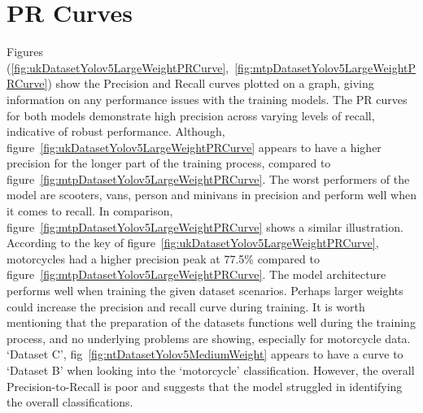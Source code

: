 \documentclass[12pt]{report} %
\begin{document}
	\section{PR Curves}
		Figures (\ref{fig:ukDatasetYolov5LargeWeightPRCurve},~\ref{fig:mtpDatasetYolov5LargeWeightPRCurve}) show the Precision and Recall curves plotted on a graph, giving information on any performance issues with the training models. The PR curves for both models demonstrate high precision across varying levels of recall, indicative of robust performance. Although, figure~\ref{fig:ukDatasetYolov5LargeWeightPRCurve} appears to have a higher precision for the longer part of the training process, compared to figure~\ref{fig:mtpDatasetYolov5LargeWeightPRCurve}. The worst performers of the model are scooters, vans, person and minivans in precision and perform well when it comes to recall. In comparison, figure~\ref{fig:mtpDatasetYolov5LargeWeightPRCurve} shows a similar illustration. According to the key of figure~\ref{fig:ukDatasetYolov5LargeWeightPRCurve}, motorcycles had a higher precision peak at 77.5\% compared to figure~\ref{fig:mtpDatasetYolov5LargeWeightPRCurve}. The model architecture performs well when training the given dataset scenarios. Perhaps larger weights could increase the precision and recall curve during training. It is worth mentioning that the preparation of the datasets functions well during the training process, and no underlying problems are showing, especially for motorcycle data. `Dataset C', fig~\ref{fig:ntDatasetYolov5MediumWeight} appears to have a curve to `Dataset B' when looking into the `motorcycle' classification. However, the overall Precision-to-Recall is poor and suggests that the model struggled in identifying the overall classifications.
\end{document}
